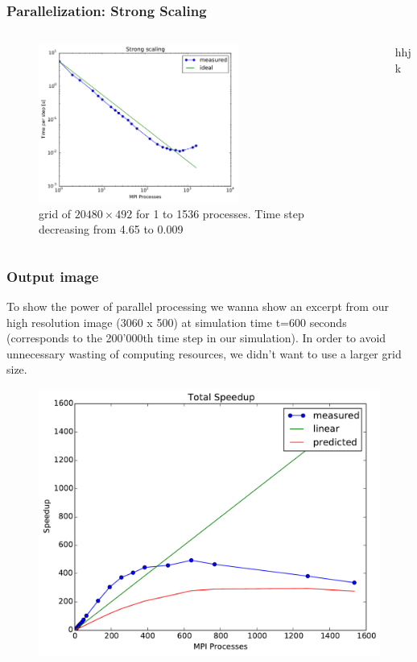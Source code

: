 \documentclass{beamer}
\begin{document}
%
%
%
\begin{frame}
\frametitle{Parallelization: Strong Scaling}
\begin{minipage}[1\textheight]{\textwidth}
\begin{columns}[T]
\begin{column}{0.7\textwidth}
\begin{figure}
\includegraphics[width=6.55cm]{strongscale.pdf}
\caption{grid of $20480\times 492$ for 1 to 1536 processes. Time step decreasing from 4.65 to 0.009}
\end{figure}
\end{column}

\begin{column}{0.5\textwidth}
\justify
hhjk


\end{column}
\end{columns}
\end{minipage}


\end{frame}

%
%
%
\begin{frame}
\frametitle{Output image}
\justify
To show the power of parallel processing we wanna show an excerpt from our high resolution image (3060 x 500) at simulation time t=600 seconds (corresponds to the 200'000th time step in our simulation). In order to avoid unnecessary wasting of computing resources, we didn't want to use a larger grid size. 
\begin{figure}
\includegraphics[width=12cm]{speedup.pdf}
\end{figure}
\end{frame}
%
%
%
\end{document}
